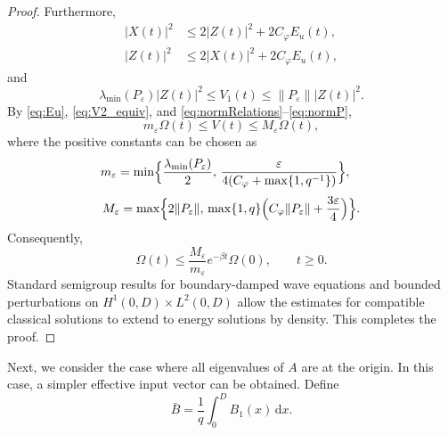 \documentclass{IEEEtran}
\theoremstyle{definition}
\begin{document}
\begin{proof}
Furthermore,
\begin{equation}
\begin{aligned}
 |X(t)|^2&\leq2|Z(t)|^2+2C_\varphi E_u(t),\\
 |Z(t)|^2&\leq2|X(t)|^2+2C_\varphi E_u(t),
\end{aligned}
\label{eq:normRelations}
\end{equation}
and
\begin{equation}
\lambda_{\min}(P_\varepsilon)|Z(t)|^2
\leq V_1(t)\leq\|P_\varepsilon\||Z(t)|^2.
\label{eq:normP}
\end{equation}
By \eqref{eq:Eu}, \eqref{eq:V2_equiv}, and
\eqref{eq:normRelations}--\eqref{eq:normP},
\begin{equation}
 m_\varepsilon\Omega(t)\leq V(t)\leq M_\varepsilon\Omega(t),
\label{eq:energyEquiv}
\end{equation}
where the positive constants can be chosen as
\begin{equation}
\begin{aligned}
m_\varepsilon&=\min\Bigl\{\frac{\lambda_{\min}(P_\varepsilon)}{2},\,
 \frac{\varepsilon}{4(C_\varphi+\max\{1,q^{-1}\})}\Bigr\},
\end{aligned}
\label{eq:lowerBoundConstant}
\end{equation}
\begin{equation}
\begin{aligned}
M_\varepsilon=\max\Bigl\{2\|P_\varepsilon\|,\,
\max\{1,q\}\Bigl(C_\varphi\|P_\varepsilon\|+\frac{3\varepsilon}{4}\Bigr)\Bigr\}.
\end{aligned}
\label{eq:upperBoundConstant}
\end{equation}
Consequently,
\begin{equation}
 \Omega(t)\leq\frac{M_\varepsilon}{m_\varepsilon}
 e^{-\beta t}\Omega(0),\qquad t\geq0.
\label{eq:stab_proof}
\end{equation}
Standard semigroup results for boundary-damped wave equations and
bounded perturbations on $H^1(0,D)\times L^2(0,D)$
\cite{curtain_zwart_introduction_1995,tsubakino_forwarding-based_2024}
allow the estimates for compatible classical solutions to extend to
energy solutions by density. This completes the proof.
\end{proof}

Next, we consider the case where all eigenvalues of $A$ are at the
origin. In this case, a simpler effective input vector can be obtained.
Define
\begin{equation}
 \bar B=\frac1q\int_0^D B_1(x)\,\mathrm dx.
\label{eq:nilpB}
\end{equation}
\end{document}
